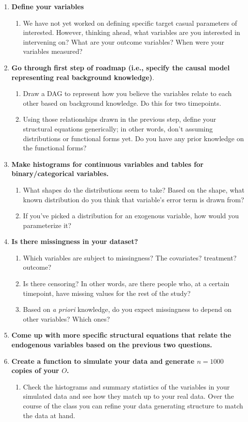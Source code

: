 \documentclass{exam}
\begin{document}
\begin{enumerate}
\item \textbf{Define your variables} 
\begin{enumerate}
\item We have not yet worked on defining specific target casual parameters of interested. However, thinking ahead, what variables are you interested in intervening on? What are your outcome variables? When were your variables measured? 
\end{enumerate}
\item \textbf{Go through first step of roadmap (i.e., specify the causal model representing real background knowledge)}.
\begin{enumerate}
\item Draw a DAG to represent how you believe the variables relate to each other based on background knowledge. Do this for two timepoints.
\item Using those relationships drawn in the previous step, define your structural equations generically; in other words, don't assuming distributions or functional forms yet. Do you have any prior knowledge on the functional forms?
\end{enumerate}
\item \textbf{Make histograms for continuous variables and tables for binary/categorical variables.}
\begin{enumerate}
\item What shapes do the distributions seem to take? Based on the shape, what known distribution do you think that variable's error term is drawn from?
\item If you've picked a distribution for an exogenous variable, how would you parameterize it?
\end{enumerate}
\item \textbf{Is there missingness in your dataset?}
\begin{enumerate}
\item Which variables are subject to missingness? The covariates? treatment? outcome? 
\item Is there censoring? In other words, are there people who, at a certain timepoint, have missing values for the rest of the study?
\item Based on \textit{a priori} knowledge, do you expect missingness to depend on other variables? Which ones?
\end{enumerate}
\item \textbf{Come up with more specific structural equations that relate the endogenous variables based on the previous two questions.}
\item \textbf{Create a function to simulate your data and generate $n = 1000$ copies of your $O$.}
\begin{enumerate}
\item Check the histograms and summary statistics of the variables in your simulated data and see how they match up to your real data. Over the course of the class you can refine your data generating structure to match the data at hand. 
\end{enumerate}
\end{enumerate}
\end{document}
